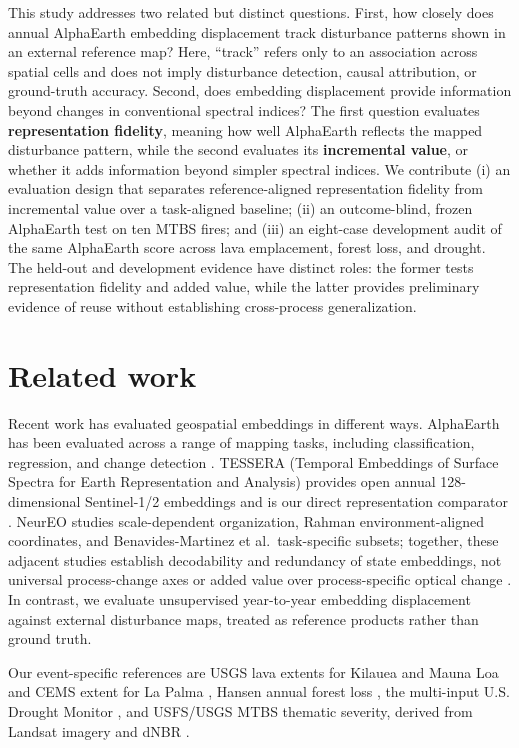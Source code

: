 \documentclass{article}
\begin{document}
This study addresses two related but distinct questions. First, how closely
does annual AlphaEarth embedding displacement track disturbance patterns shown
in an external reference map? Here, ``track'' refers only to an association
across spatial cells and does not imply disturbance detection, causal
attribution, or ground-truth accuracy. Second, does embedding displacement
provide information beyond changes in conventional spectral indices? The first
question evaluates \textbf{representation fidelity}, meaning how well
AlphaEarth reflects the mapped disturbance pattern, while the second evaluates
its \textbf{incremental value}, or whether it adds information beyond simpler
spectral indices. We contribute (i) an evaluation design that separates
reference-aligned representation fidelity from incremental value over a
task-aligned baseline; (ii) an outcome-blind, frozen AlphaEarth test on ten
MTBS fires; and (iii) an eight-case development audit of the same AlphaEarth
score across lava emplacement, forest loss, and drought. The held-out and
development evidence have distinct roles: the former tests representation
fidelity and added value, while the latter provides preliminary evidence of
reuse without establishing cross-process generalization.

\section{Related work}

Recent work has evaluated geospatial embeddings in different ways. AlphaEarth
has been evaluated across a range of mapping tasks, including classification,
regression, and change detection \citep{brown2025alphaearth}. TESSERA
(Temporal Embeddings of Surface Spectra for Earth Representation and Analysis)
provides open annual 128-dimensional Sentinel-1/2 embeddings and is our direct
representation comparator \citep{feng2026tessera}. NeurEO studies
scale-dependent organization, Rahman environment-aligned coordinates, and
Benavides-Martinez et al.\ task-specific subsets; together, these adjacent
studies establish decodability and redundancy of state embeddings, not
universal process-change axes or added value over process-specific optical
change \citep{vanderplas2025neureo,
rahman2026physicallyinterpretablealphaearthfoundation,benavides2026earth}.
In contrast, we evaluate unsupervised
year-to-year embedding displacement against external disturbance maps, treated
as reference products rather than ground truth.

Our event-specific references are USGS lava extents for Kilauea and Mauna Loa
and CEMS extent for La Palma
\citep{zoeller2020kilauea,cems2021emsr546,zoeller2024maunaloa}, Hansen annual
forest loss \citep{hansen2013forest}, the multi-input U.S. Drought Monitor
\citep{svoboda2002droughtmonitor}, and USFS/USGS MTBS thematic severity,
derived from Landsat imagery and dNBR \citep{eidenshink2007mtbs}.
\end{document}
